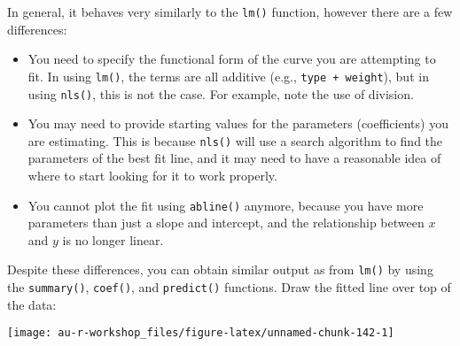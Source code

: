 \documentclass[]{book}
\newenvironment{Shaded}{\begin{snugshade}}{\end{snugshade}}
\newcommand{\KeywordTok}[1]{\textcolor[rgb]{0.13,0.29,0.53}{\textbf{#1}}}
\newcommand{\DataTypeTok}[1]{\textcolor[rgb]{0.13,0.29,0.53}{#1}}
\newcommand{\DecValTok}[1]{\textcolor[rgb]{0.00,0.00,0.81}{#1}}
\newcommand{\FloatTok}[1]{\textcolor[rgb]{0.00,0.00,0.81}{#1}}
\newcommand{\StringTok}[1]{\textcolor[rgb]{0.31,0.60,0.02}{#1}}
\newcommand{\OperatorTok}[1]{\textcolor[rgb]{0.81,0.36,0.00}{\textbf{#1}}}
\newcommand{\NormalTok}[1]{#1}
\providecommand{\tightlist}{%
  \setlength{\itemsep}{0pt}\setlength{\parskip}{0pt}}
\theoremstyle{definition}
\theoremstyle{definition}
\theoremstyle{definition}
\theoremstyle{remark}
\begin{document}
In general, it behaves very similarly to the \texttt{lm()} function,
however there are a few differences:

\begin{itemize}
\tightlist
\item
  You need to specify the functional form of the curve you are
  attempting to fit. In using \texttt{lm()}, the terms are all additive
  (e.g., \texttt{type\ +\ weight}), but in using \texttt{nls()}, this is
  not the case. For example, note the use of division.
\item
  You may need to provide starting values for the parameters
  (coefficients) you are estimating. This is because \texttt{nls()} will
  use a search algorithm to find the parameters of the best fit line,
  and it may need to have a reasonable idea of where to start looking
  for it to work properly.
\item
  You cannot plot the fit using \texttt{abline()} anymore, because you
  have more parameters than just a slope and intercept, and the
  relationship between \(x\) and \(y\) is no longer linear.
\end{itemize}

Despite these differences, you can obtain similar output as from
\texttt{lm()} by using the \texttt{summary()}, \texttt{coef()}, and
\texttt{predict()} functions. Draw the fitted line over top of the data:

\begin{Shaded}
\end{Shaded}

\begin{center}\texttt{[image: au-r-workshop\_files/figure-latex/unnamed-chunk-142-1]} \end{center}
\end{document}
